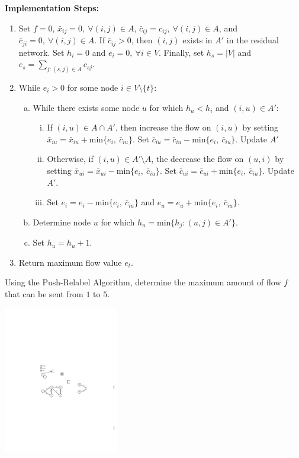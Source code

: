 \documentclass[12pt]{article}
\theoremstyle{definition}
\begin{document}
\textbf{Implementation Steps:}

\begin{enumerate}
	\item Set $f = 0$, $\bar{x}_{ij} = 0, \ \forall (i,j) \in A$, $\bar{c}_{ij} = c_{ij}, \ \forall (i,j) \in A$, and $\bar{c}_{ji} = 0, \ \forall (i,j) \in A$. If $\bar{c}_{ij} > 0$, then $(i,j)$ exists in $A'$ in the residual network. Set $h_i = 0$ and $e_i = 0, \ \forall i \in V$. Finally, set $h_s = |V|$ and $e_s = \sum_{j:(s,j) \in A}c_{sj}$.
	\item While $e_i > 0$ for some node $i \in V \setminus \{t\}$:
	\begin{enumerate}[a.]
		\item While there exists some node $u$ for which $h_u < h_i$ and $(i,u) \in A'$:
		\begin{enumerate}[i.]
		
			\item If $(i,u) \in A \cap A'$, then increase the flow on $(i,u)$ by setting $\bar{x}_{iu} = \bar{x}_{iu} + \textrm{min}\{e_i, \ \bar{c}_{iu}\}$. Set $\bar{c}_{iu} = \bar{c}_{iu} - \textrm{min}\{e_i, \ \bar{c}_{iu}\}$. Update $A'$
			\item Otherwise, if $(i,u) \in A' \setminus A$, the decrease the flow on $(u,i)$ by setting $\bar{x}_{ui} = \bar{x}_{ui} - \textrm{min}\{e_i, \ \bar{c}_{iu}\}$. Set $\bar{c}_{ui} = \bar{c}_{ui} + \textrm{min}\{e_i, \ \bar{c}_{iu}\}$. Update $A'$.
			\item Set $e_i = e_i - \textrm{min}\{e_i, \ \bar{c}_{iu}\}$ and $e_u = e_u + \textrm{min}\{e_i, \ \bar{c}_{iu}\}$. 
		\end{enumerate}
		\item Determine node $u$ for which $h_u = \textrm{min}\{h_j: (u,j) \in A'\}$.
		\item Set $h_u = h_u + 1$.
	\end{enumerate}
	\item Return maximum flow value $e_t$.
\end{enumerate}
\newpage

Using the Push-Relabel Algorithm, determine the maximum amount of flow $f$ that can be sent from $1$ to $5$.
\begin{center}
\includegraphics[width=5cm]{shortestpathexample1}
\end{center}
\vfill
\end{document}
